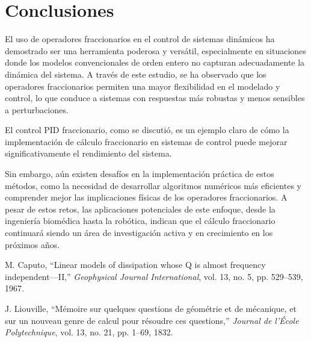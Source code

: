 \documentclass[conference]{IEEEtran}
\begin{document}
\section*{Conclusiones}
El uso de operadores fraccionarios en el control de sistemas dinámicos ha demostrado ser una herramienta poderosa y versátil, especialmente en situaciones donde los modelos convencionales de orden entero no capturan adecuadamente la dinámica del sistema. A través de este estudio, se ha observado que los operadores fraccionarios permiten una mayor flexibilidad en el modelado y control, lo que conduce a sistemas con respuestas más robustas y menos sensibles a perturbaciones.

El control PID fraccionario, como se discutió, es un ejemplo claro de cómo la implementación de cálculo fraccionario en sistemas de control puede mejorar significativamente el rendimiento del sistema. 

Sin embargo, aún existen desafíos en la implementación práctica de estos métodos, como la necesidad de desarrollar algoritmos numéricos más eficientes y comprender mejor las implicaciones físicas de los operadores fraccionarios. A pesar de estos retos, las aplicaciones potenciales de este enfoque, desde la ingeniería biomédica hasta la robótica, indican que el cálculo fraccionario continuará siendo un área de investigación activa y en crecimiento en los próximos años.

\begin{thebibliography}{00}
	 M. Caputo, ``Linear models of dissipation whose Q is almost frequency independent—II,'' \textit{Geophysical Journal International}, vol. 13, no. 5, pp. 529--539, 1967.
	
	 J. Liouville, ``Mémoire sur quelques questions de géométrie et de mécanique, et sur un nouveau genre de calcul pour résoudre ces questions,'' \textit{Journal de l'École Polytechnique}, vol. 13, no. 21, pp. 1--69, 1832.
\end{thebibliography}
\end{document}
